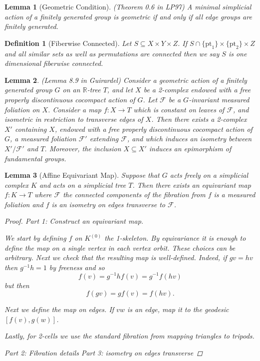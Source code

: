\documentclass{article}
\theoremstyle{mystyle}
\newtheorem{lem}{Lemma}[section]
\newtheorem{defn}{Definition}[section]
\theoremstyle{remark}
\begin{document}
\begin{lem}
    [Geometric Condition]
    \label{lem:simpgeo} 
    (Theorem 0.6 in LP97)
    A minimal simplicial action of a finitely generated group is geometric if and only if all edge groups are finitely generated.
\end{lem}
\begin{defn}
    [Fiberwise Connected]
    \label{def:connfibers} 
    Let \(S \subseteq X \times Y \times Z\). If \(S \cap \{\text{pt}_1\} \times \{\text{pt}_2\} \times Z\) and all similar sets as well as permutations are connected then we say \(S\) is one dimensional fiberwise connected.
\end{defn}
\begin{lem}
    \label{lem:guirardel-extension}
    (Lemma 8.9 in Guirardel)
    Consider a geometric action of a finitely generated group \(G\) on an \(\mathbb{R}\)-tree \(T\), and let \(X\) be a 2-complex endowed with a free properly discontinuous cocompact action of \(G\). Let \(\mathscr{F}\) be a \(G\)-invariant measured foliation on \(X\). Consider a map \(f: X \to T\) which is constant on leaves of \(\mathscr{F}\), and isometric in restriction to transverse edges of \(X\). Then there exists a 2-complex \( X'\) containing \(X\), endowed with a free properly discontinuous cocompact action of \(G\), a measured foliation \(\mathscr{F} '\) extending \(\mathscr{F}\), and which induces an isometry between \(X'/ \mathscr{F}'\) and \(T\). Moreover, the inclusion \(X \subseteq X'\) induces an epimorphism of fundamental groups.
\end{lem}
\begin{lem}
    [Affine Equivariant Map]
    \label{lem:affineequivariantmap} 
    Suppose that \(G\) acts freely on a simplicial complex \(K\) and acts on a simplicial tree \(T\). Then there exists an equivariant map \(f: K \to T\) where \(\mathscr{F}\) the connected components of the fibration from \(f\) is a measured foliation and \(f\) is an isometry on edges transverse to \(\mathscr{F}\).
    \begin{proof}
        Part 1: Construct an equivariant map.

        We start by defining \(f\) on \(K^{(0)}\) the 1-skeleton. By equivariance it is enough to define the map on a single vertex in each vertex orbit. These choices can be arbitrary. Next we check that the resulting map is well-defined. Indeed, if \(gv=hv\) then \(g^{-1} h = 1\) by freeness and so \[ f(v)=g^{-1}h f(v)=g^{-1} f(hv) \] but then \[ f(gv)=gf(v)=f(hv).\] 
        
        Next we define the map on edges. If \(vw\) is an edge, map it to the geodesic \([f(v),g(w)]\). 
        
        Lastly, for 2-cells we use the standard fibration from mapping triangles to tripods.
        
        Part 2: Fibration details
        Part 3: isometry on edges transverse
    \end{proof}
\end{lem}
\end{document}
